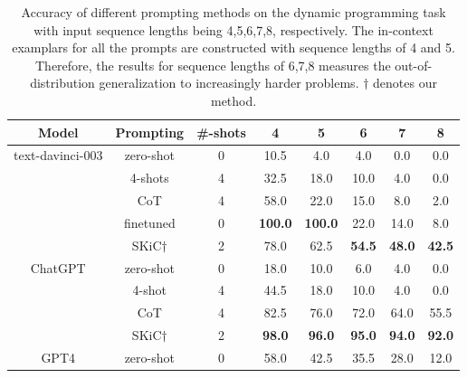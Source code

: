 \begin{table}[t]
\caption{Accuracy of different prompting methods on the dynamic programming task with input sequence lengths being 4,5,6,7,8, respectively. The in-context examplars for all the prompts are constructed with sequence lengths of 4 and 5. Therefore, the results for sequence lengths of 6,7,8 measures the out-of-distribution generalization to increasingly harder problems. $\dag$ denotes our method.} \label{Tab:dp_results}
\centering
\begin{tabular}{c|c|c|cc|ccc} \toprule
\textbf{Model}               & \textbf{Prompting}&\textbf{\#-shots} & \multicolumn{1}{c}{\textbf{4}} & \textbf{5}  & \textbf{6}  & \textbf{7}  & \textbf{8}  \\ \midrule\midrule 

\multirow{5}{*}{text-davinci-003} & zero-shot  &0        & 10.5                              & 4.0           & 4.0           & 0.0           & 0.0           \\
                          & 4-shots     &4       & 32.5                             & 18.0          & 10.0          & 4.0           & 0.0           \\
                          & CoT     &4           & 58.0                             & 22.0          & 15.0          & 8.0           & 2.0           \\
                          &finetuned & 0 &\textbf{100.0} &\textbf{100.0} &22.0 &14.0 &8.0\\
                          & SKiC$\dag$   &2             & 78.0                    & 62.5 & \textbf{54.5} & \textbf{48.0} & \textbf{42.5} \\ \midrule
\multirow{4}{*}{ChatGPT}  & zero-shot   &0       & 18.0                             & 10.0          & 6.0           & 4.0           & 0.0           \\
                          & 4-shot    &4         & 44.5                            & 18.0          & 10.0          & 4.0           & 0.0           \\
                          & CoT    &4            & 82.5                             & 76.0          & 72.0        & 64.0           & 55.5           \\
                          & SKiC$\dag$    &2            & \textbf{98.0}                    & \textbf{96.0} & \textbf{95.0} & \textbf{94.0} & \textbf{92.0} \\ \midrule
\multirow{4}{*}{GPT4}     & zero-shot   &0       & 58.0                             & 42.5          & 35.5          & 28.0          & 12.0          \\

\end{tabular}
\end{table}
